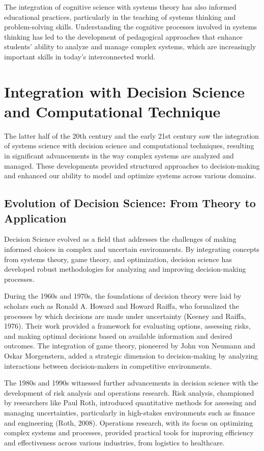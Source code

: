 \documentclass[twocolumn]{article}
\begin{document}
\textcolor{secondary}{The integration of cognitive science with systems theory has also informed educational practices, particularly in the teaching of systems thinking and problem-solving skills. Understanding the cognitive processes involved in systems thinking has led to the development of pedagogical approaches that enhance students' ability to analyze and manage complex systems, which are increasingly important skills in today’s interconnected world.}


\section{Integration with Decision Science and Computational Technique}

\textcolor{primary}{The latter half of the 20th century and the early 21st century saw the integration of systems science with decision science and computational techniques, resulting in significant advancements in the way complex systems are analyzed and managed. These developments provided structured approaches to decision-making and enhanced our ability to model and optimize systems across various domains.}

\subsection{Evolution of Decision Science: From Theory to Application}

\textcolor{primary}{Decision Science evolved as a field that addresses the challenges of making informed choices in complex and uncertain environments. By integrating concepts from systems theory, game theory, and optimization, decision science has developed robust methodologies for analyzing and improving decision-making processes.}

\textcolor{secondary}{During the 1960s and 1970s, the foundations of decision theory were laid by scholars such as Ronald A. Howard and Howard Raiffa, who formalized the processes by which decisions are made under uncertainty (Keeney and Raiffa, 1976). Their work provided a framework for evaluating options, assessing risks, and making optimal decisions based on available information and desired outcomes. The integration of game theory, pioneered by John von Neumann and Oskar Morgenstern, added a strategic dimension to decision-making by analyzing interactions between decision-makers in competitive environments.}

\textcolor{primary}{The 1980s and 1990s witnessed further advancements in decision science with the development of risk analysis and operations research. Risk analysis, championed by researchers like Paul Roth, introduced quantitative methods for assessing and managing uncertainties, particularly in high-stakes environments such as finance and engineering (Roth, 2008). Operations research, with its focus on optimizing complex systems and processes, provided practical tools for improving efficiency and effectiveness across various industries, from logistics to healthcare.}
\end{document}
